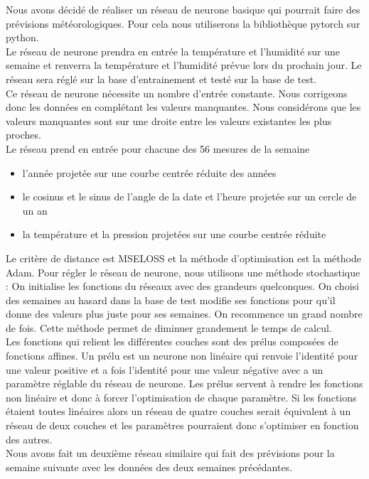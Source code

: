 \documentclass[11pt,a4paper]{article}
\begin{document}
Nous avons décidé de réaliser un réseau de neurone basique qui pourrait faire des prévisions météorologiques. Pour cela nous utiliserons la bibliothèque pytorch sur python.\\
Le réseau de neurone prendra en entrée la température et l'humidité sur une semaine et renverra la température et l'humidité prévue lors du prochain jour. Le réseau sera réglé sur la base d'entrainement et testé sur la base de test.\\
Ce réseau de neurone nécessite un nombre d'entrée constante. Nous corrigeons donc les données en complétant les valeurs manquantes. Nous considérons que les valeurs manquantes sont sur une droite entre les valeurs existantes les plus proches.\\
Le réseau prend en entrée pour chacune des 56 mesures de la semaine 
\begin{itemize}
\item  l'année projetée sur une courbe centrée réduite des années
\item  le cosinus et le sinus de l'angle de la date et l'heure projetée sur un cercle de un an
\item  la température et la pression projetées sur une courbe centrée réduite
\end{itemize}
Le critère de distance est MSELOSS et la méthode d'optimisation est la méthode Adam.
Pour régler le réseau de neurone, nous utilisons une méthode stochastique : 
On initialise les fonctions du réseaux avec des grandeurs quelconques.
On choisi des semaines au hasard dans la base de test modifie ses fonctions pour qu'il donne des valeurs plus juste pour ses semaines. On recommence un grand nombre de fois. Cette méthode permet de diminuer grandement le temps de calcul.\\
Les fonctions qui relient les différentes couches sont des prélus composées de fonctions affines. Un prélu est un neurone non linéaire qui renvoie l'identité pour une valeur positive et a fois l'identité pour une valeur négative avec a un paramètre réglable du réseau de neurone. Les prélus servent à rendre les fonctions non linéaire et donc à forcer l'optimisation de chaque paramètre. Si les fonctions étaient toutes linéaires alors un réseau de quatre couches serait équivalent à un réseau de deux couches et les paramètres pourraient donc s'optimiser en fonction des autres.\\
Nous avons fait un deuxième réseau similaire qui fait des prévisions pour la semaine suivante avec les données des deux semaines précédantes.\\
\end{document}
